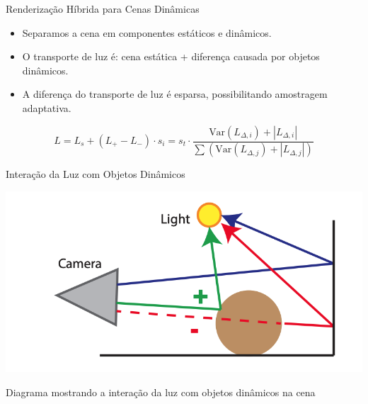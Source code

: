 \documentclass[aspectratio=169,xcolor=table]{beamer}
\begin{document}
\begin{frame}{Renderização Híbrida para Cenas Dinâmicas}
    \begin{itemize}
        \item Separamos a cena em componentes estáticos e dinâmicos.
        \item O transporte de luz é: cena estática + diferença causada por objetos dinâmicos.
        \item A diferença do transporte de luz é esparsa, possibilitando amostragem adaptativa.
    \end{itemize}
    \begin{equation*}
        L = L_s + (L_+ - L_-) \cdot s_i = s_t \cdot \frac{\text{Var}(L_{\Delta,i}) + |L_{\Delta,i}|}{\sum(\text{Var}(L_{\Delta,j}) + |L_{\Delta,j}|)}
    \end{equation*}
\end{frame}

\begin{frame}{Interação da Luz com Objetos Dinâmicos}
    \begin{center}
        \includegraphics[height=0.7\textheight]{interacao-com-luz-objetos-dinamicos}
    \end{center}
    \begin{center}
        \small{Diagrama mostrando a interação da luz com objetos dinâmicos na cena}
    \end{center}
\end{frame}
\end{document}
